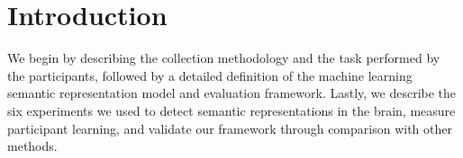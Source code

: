 \section{Introduction}

We begin by describing the collection methodology and the task performed by the participants, followed by a detailed definition of the machine learning semantic representation model and evaluation framework. Lastly, we describe the six experiments we used to detect semantic representations in the brain, measure participant learning, and validate our framework through comparison with other methods.
